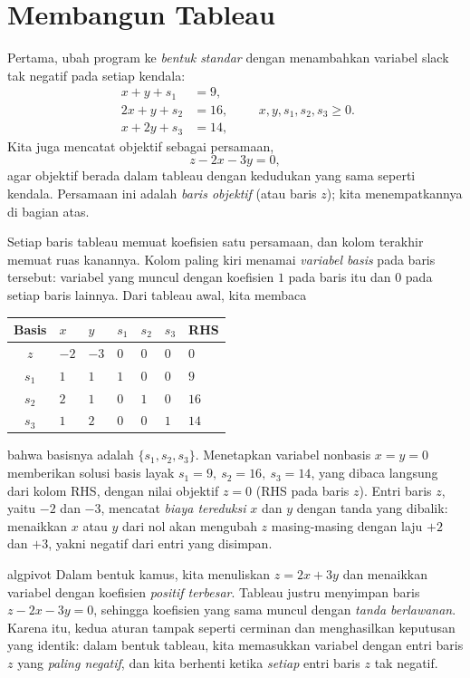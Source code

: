 \section{Membangun Tableau}
\label{sec:tableau-building}

Pertama, ubah program ke \emph{bentuk standar} dengan menambahkan variabel
slack tak negatif pada setiap kendala:
\begin{equation*}
\begin{aligned}
x + y  + s_1 &= 9,\\
2x + y + s_2 &= 16,\\
x + 2y + s_3 &= 14,
\end{aligned}
\qquad x,y,s_1,s_2,s_3 \ge 0.
\end{equation*}
Kita juga mencatat objektif sebagai persamaan,
\[
z - 2x - 3y = 0,
\]
agar objektif berada dalam tableau dengan kedudukan yang sama seperti kendala.
Persamaan ini adalah \emph{baris objektif} (atau baris $z$); kita menempatkannya
di bagian atas.

Setiap baris tableau memuat koefisien satu persamaan, dan kolom terakhir memuat
ruas kanannya. Kolom paling kiri menamai \emph{variabel basis} pada baris
tersebut: variabel yang muncul dengan koefisien $1$ pada baris itu dan $0$ pada
setiap baris lainnya. Dari tableau awal, kita membaca
\begin{center}
\renewcommand{\arraystretch}{1.3}
\begin{tabular}{c|ZZZZZ|Z}
\toprule
Basis & $x$ & $y$ & $s_1$ & $s_2$ & $s_3$ & RHS\\
\midrule
$z$   & $-2$ & $-3$ & $0$ & $0$ & $0$ & $0$\\
\midrule
$s_1$ & $1$ & $1$ & $1$ & $0$ & $0$ & $9$\\
$s_2$ & $2$ & $1$ & $0$ & $1$ & $0$ & $16$\\
$s_3$ & $1$ & $2$ & $0$ & $0$ & $1$ & $14$\\
\bottomrule
\end{tabular}
\end{center}
bahwa basisnya adalah $\{s_1,s_2,s_3\}$. Menetapkan variabel nonbasis
$x=y=0$ memberikan solusi basis layak $s_1=9,\ s_2=16,\ s_3=14$, yang
dibaca langsung dari kolom RHS, dengan nilai objektif $z=0$ (RHS pada baris
$z$). Entri baris $z$, yaitu $-2$ dan $-3$, mencatat \emph{biaya tereduksi}
$x$ dan $y$ dengan tanda yang dibalik: menaikkan $x$ atau $y$ dari nol akan
mengubah $z$ masing-masing dengan laju $+2$ dan $+3$, yakni negatif dari entri
yang disimpan.

\begin{steppanel}{algpivot}
\label{panel:tableau-sign-convention}%
 Dalam bentuk kamus, kita menuliskan
$z = 2x + 3y$ dan menaikkan variabel dengan koefisien \emph{positif terbesar}.
Tableau justru menyimpan baris $z - 2x - 3y = 0$, sehingga koefisien yang sama
muncul dengan \emph{tanda berlawanan}. Karena itu, kedua aturan tampak seperti
cerminan dan menghasilkan keputusan yang identik: dalam bentuk tableau, kita
memasukkan variabel dengan entri baris $z$ yang \emph{paling negatif}, dan kita
berhenti ketika \emph{setiap} entri baris $z$ tak negatif.
\end{steppanel}

